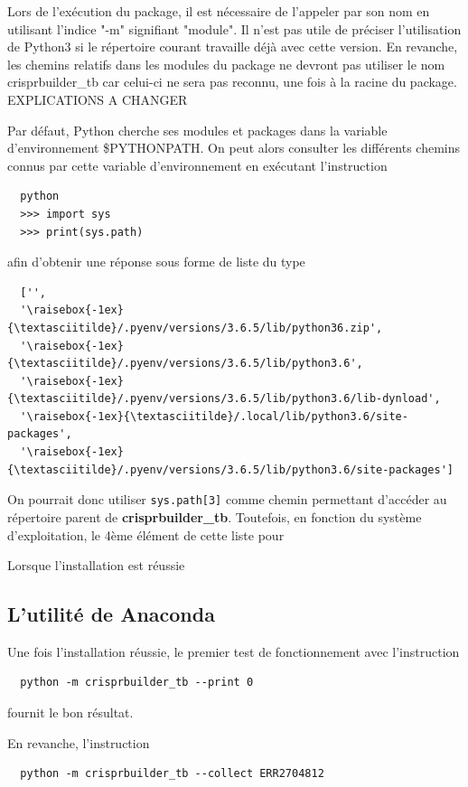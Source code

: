 \documentclass[twoside,a4paper,11pt,frenchb,openany]{report}
\begin{document}
Lors de l'exécution du package, il est nécessaire de l'appeler par son nom en utilisant l'indice "-m" signifiant "module". Il n'est pas utile de préciser l'utilisation de Python3 si le répertoire courant travaille déjà avec cette version. En revanche, les chemins relatifs dans les modules du package ne devront pas utiliser le nom crisprbuilder\_tb car celui-ci ne sera pas reconnu, une fois à la racine du package. EXPLICATIONS A CHANGER

Par défaut, Python cherche ses modules et packages dans la variable d'environnement \$PYTHONPATH. On peut alors consulter les différents chemins connus par cette variable d'environnement en exécutant l'instruction
\begin{verbatim}  python
  >>> import sys
  >>> print(sys.path)\end{verbatim}

afin d'obtenir une réponse sous forme de liste du type
\begin{verbatim}  ['',
  '\raisebox{-1ex}{\textasciitilde}/.pyenv/versions/3.6.5/lib/python36.zip',
  '\raisebox{-1ex}{\textasciitilde}/.pyenv/versions/3.6.5/lib/python3.6',
  '\raisebox{-1ex}{\textasciitilde}/.pyenv/versions/3.6.5/lib/python3.6/lib-dynload',    
  '\raisebox{-1ex}{\textasciitilde}/.local/lib/python3.6/site-packages',
  '\raisebox{-1ex}{\textasciitilde}/.pyenv/versions/3.6.5/lib/python3.6/site-packages']\end{verbatim}

On pourrait donc utiliser \texttt{sys.path[3]} comme chemin permettant d'accéder au répertoire parent de \textbf{crisprbuilder\_tb}. Toutefois, en fonction du système d'exploitation,  le 4ème élément de cette liste pour

Lorsque l'installation est réussie

\subsection{L'utilité de Anaconda}

Une fois l'installation réussie, le premier test de fonctionnement avec l'instruction

\begin{verbatim}
  python -m crisprbuilder_tb --print 0
\end{verbatim}

fournit le bon résultat.

En revanche, l'instruction

\begin{verbatim}
  python -m crisprbuilder_tb --collect ERR2704812
\end{verbatim}
\end{document}
